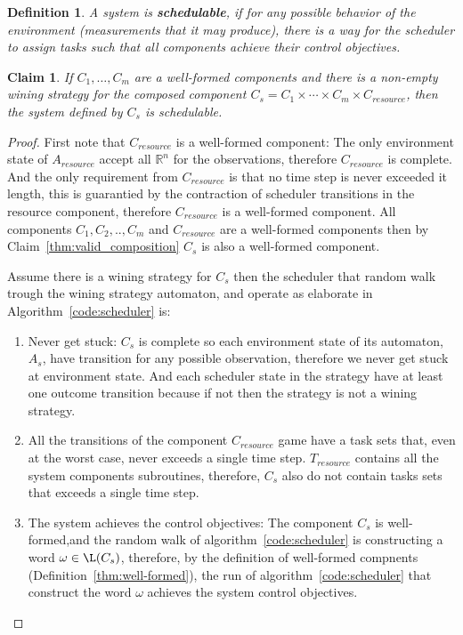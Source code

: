 \documentclass[ twoside, 12pt ]{article}
\newcommand\R{{\mathbb R}}
\newtheorem{dfn}{Definition} %
\newtheorem{claim}[thm]{Claim}
\begin{document}
\begin{dfn}
	A system is \textbf{schedulable}, if for any possible behavior of the environment (measurements that it may produce), there is a way for the scheduler to assign tasks such that all components achieve their control objectives.
\end{dfn}

\begin{claim}
    If $C_1,\dots , C_m$ are a well-formed components and there is a non-empty wining strategy for the composed component $C_s=C_1 \times \cdots \times C_m \times C_ {resource}$, then the system defined by $C_s$ is schedulable.
\end{claim}
\begin{proof}
    First note that $C_{resource}$ is a well-formed component:
    The only environment state of $A_{resource}$ accept all $\R^n$ for the observations, therefore $C_{resource}$ is complete. 
    And the only requirement from $C_{resource}$ is that no time step is never exceeded it length, this is guarantied by the contraction of scheduler transitions in the resource component, therefore  $C_{resource}$ is a well-formed component.
    All components $C_1 , C_2 , .. , C_m$ and $C_{resource} $ are a well-formed components then by Claim~\ref{thm:valid_composition} $C_s $ is also a well-formed component.
    
    Assume there is a wining strategy for $C_s$ then the scheduler that random walk trough the wining strategy automaton, and operate as elaborate in Algorithm~\ref{code:scheduler} is:
    \begin{enumerate}
        \item Never get stuck: $C_s$ is complete so each environment state of its automaton, $A_s$, have transition for any possible observation,
        therefore we never get stuck at environment state.
        And each scheduler state in the strategy have at least one outcome transition because if not then the strategy is not a wining strategy. 
        
        \item All the transitions of the component $C_{resource}$ game have a task sets that, even at the worst case, never exceeds a single time step. 
        $T_{resource}$ contains all the system components subroutines, therefore, $C_s$ also do not contain tasks sets that exceeds a single time step.
        
        \item The system achieves the control objectives: The component $C_s$ is well-formed,and the random walk of algorithm~\ref{code:scheduler} is constructing a word $\omega \in \L(C_s)$, therefore, by the definition of well-formed compnents (Definition~\ref{thm:well-formed}), the run of algorithm~\ref{code:scheduler} that construct the word $\omega$ achieves the system control objectives.
    \end{enumerate}
\end{proof}
\end{document}

